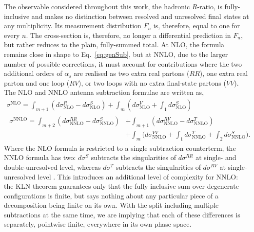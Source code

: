 The observable considered throughout this work, the hadronic $R$-ratio,
is fully-inclusive and makes no distinction between resolved and unresolved 
final states at any multiplicity. Its measurement distribution $F_n$ is, therefore,
equal to one for every $n$. The cross-section is, therefore, no longer a differential 
prediction in $F_n$, but rather reduces to the plain, fully-summed total. At NLO, the 
formula remains close in shape to Eq.~\eqref{eq:genSub}, but at NNLO, due to the 
larger number of possible corrections, it must account for contributions where 
the two additional orders of $\alpha_s$ are realised as two extra real partons 
($RR$), one extra real parton and one loop ($RV$), or two loops with no extra 
final-state partons ($VV$). The NLO and NNLO antenna subtraction formulae are 
written as,
\begin{equation}\label{eq:nnloCross}
    \begin{gathered}
        \sigma^\text{NLO} = \int_{m+1}\left(d\sigma^R_\text{NLO}-d\sigma^S_\text{NLO}\right)+\int_m\left(d\sigma^V_\text{NLO}+\int_1 d\sigma^S_\text{NLO}\right)\\
        \begin{aligned}
            \sigma^\text{NNLO} = \int_{m+2}\left(d\sigma^{RR}_\text{NNLO}-d\sigma^S_\text{NNLO}\right)&+\int_{m+1}\left(d\sigma^{RV}_\text{NNLO}-d\sigma^T_\text{NNLO}\right)\\
                                                                                                      &+\int_m\Bigg(d\sigma^{VV}_\text{NNLO}+\int_1 d\sigma^T_\text{NNLO}+\int_2 d\sigma^S_\text{NNLO}\Bigg).
        \end{aligned}
    \end{gathered}
\end{equation}
Where the NLO formula is restricted to a single subtraction counterterm, the NNLO
formula has two: $d\sigma^S$ subtracts the singularities of $d\sigma^{RR}$ at
single- and double-unresolved level, whereas $d\sigma^T$ subtracts the singularities
of $d\sigma^{RV}$ at single-unresolved level \cite{Gehrmann-DeRidder:2005btv}.
This introduces an additional level of
complexity for NNLO: the KLN theorem guarantees only that the fully inclusive sum over degenerate
configurations is finite, but says nothing about any particular piece of a decomposition being finite on its
own. With the split including multiple subtractions at the same time, we are implying that each of these
differences is separately, pointwise finite, everywhere in its own phase space.

